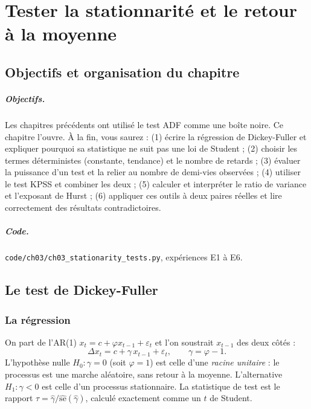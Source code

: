 \chapter{Tester la stationnarité et le retour à la moyenne}
\label{ch:3}

\section{Objectifs et organisation du chapitre}

\paragraph{Objectifs.} Les chapitres précédents ont utilisé le test ADF comme une boîte noire. Ce chapitre l'ouvre. À la fin, vous saurez : (1) écrire la régression de Dickey-Fuller et expliquer pourquoi sa statistique ne suit pas une loi de Student ; (2) choisir les termes déterministes (constante, tendance) et le nombre de retards ; (3) évaluer la puissance d'un test et la relier au nombre de demi-vies observées ; (4) utiliser le test KPSS et combiner les deux ; (5) calculer et interpréter le ratio de variance et l'exposant de Hurst ; (6) appliquer ces outils à deux paires réelles et lire correctement des résultats contradictoires.

\paragraph{Code.} \texttt{code/ch03/ch03\_stationarity\_tests.py}, expériences E1 à E6.

\section{Le test de Dickey-Fuller}

\subsection{La régression}

On part de l'AR(1) $x_t = c + \varphi x_{t-1} + \varepsilon_t$ et l'on soustrait $x_{t-1}$ des deux côtés :
\[
\Delta x_t = c + \gamma\,x_{t-1} + \varepsilon_t, \qquad \gamma = \varphi - 1.
\]
L'hypothèse nulle $H_0 : \gamma = 0$ (soit $\varphi = 1$) est celle d'une \emph{racine unitaire} : le processus est une marche aléatoire, sans retour à la moyenne. L'alternative $H_1 : \gamma < 0$ est celle d'un processus stationnaire. La statistique de test est le rapport $\tau = \hat\gamma/\widehat{\mathrm{se}}(\hat\gamma)$, calculé exactement comme un $t$ de Student.

